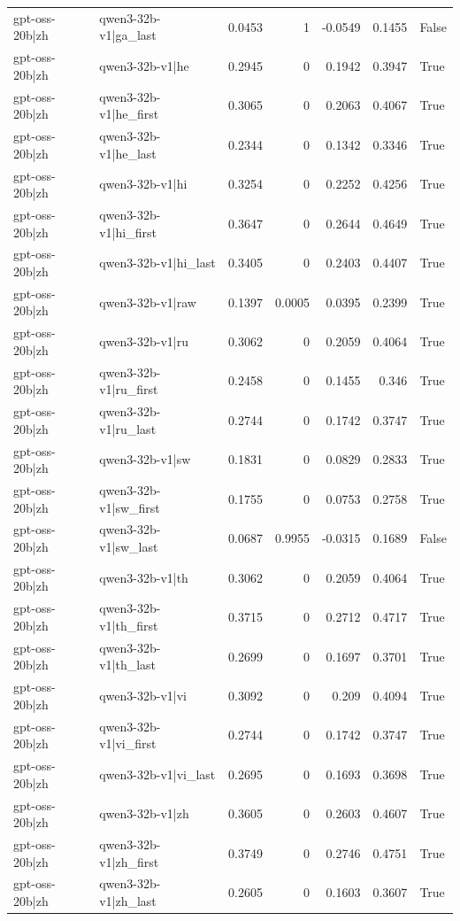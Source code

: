 \begin{table}
\begin{tabular}{l l r r r r l}
gpt-oss-20b|zh & qwen3-32b-v1|ga_last & 0.0453 & 1 & -0.0549 & 0.1455 & False \\
gpt-oss-20b|zh & qwen3-32b-v1|he & 0.2945 & 0 & 0.1942 & 0.3947 & True \\
gpt-oss-20b|zh & qwen3-32b-v1|he_first & 0.3065 & 0 & 0.2063 & 0.4067 & True \\
gpt-oss-20b|zh & qwen3-32b-v1|he_last & 0.2344 & 0 & 0.1342 & 0.3346 & True \\
gpt-oss-20b|zh & qwen3-32b-v1|hi & 0.3254 & 0 & 0.2252 & 0.4256 & True \\
gpt-oss-20b|zh & qwen3-32b-v1|hi_first & 0.3647 & 0 & 0.2644 & 0.4649 & True \\
gpt-oss-20b|zh & qwen3-32b-v1|hi_last & 0.3405 & 0 & 0.2403 & 0.4407 & True \\
gpt-oss-20b|zh & qwen3-32b-v1|raw & 0.1397 & 0.0005 & 0.0395 & 0.2399 & True \\
gpt-oss-20b|zh & qwen3-32b-v1|ru & 0.3062 & 0 & 0.2059 & 0.4064 & True \\
gpt-oss-20b|zh & qwen3-32b-v1|ru_first & 0.2458 & 0 & 0.1455 & 0.346 & True \\
gpt-oss-20b|zh & qwen3-32b-v1|ru_last & 0.2744 & 0 & 0.1742 & 0.3747 & True \\
gpt-oss-20b|zh & qwen3-32b-v1|sw & 0.1831 & 0 & 0.0829 & 0.2833 & True \\
gpt-oss-20b|zh & qwen3-32b-v1|sw_first & 0.1755 & 0 & 0.0753 & 0.2758 & True \\
gpt-oss-20b|zh & qwen3-32b-v1|sw_last & 0.0687 & 0.9955 & -0.0315 & 0.1689 & False \\
gpt-oss-20b|zh & qwen3-32b-v1|th & 0.3062 & 0 & 0.2059 & 0.4064 & True \\
gpt-oss-20b|zh & qwen3-32b-v1|th_first & 0.3715 & 0 & 0.2712 & 0.4717 & True \\
gpt-oss-20b|zh & qwen3-32b-v1|th_last & 0.2699 & 0 & 0.1697 & 0.3701 & True \\
gpt-oss-20b|zh & qwen3-32b-v1|vi & 0.3092 & 0 & 0.209 & 0.4094 & True \\
gpt-oss-20b|zh & qwen3-32b-v1|vi_first & 0.2744 & 0 & 0.1742 & 0.3747 & True \\
gpt-oss-20b|zh & qwen3-32b-v1|vi_last & 0.2695 & 0 & 0.1693 & 0.3698 & True \\
gpt-oss-20b|zh & qwen3-32b-v1|zh & 0.3605 & 0 & 0.2603 & 0.4607 & True \\
gpt-oss-20b|zh & qwen3-32b-v1|zh_first & 0.3749 & 0 & 0.2746 & 0.4751 & True \\
gpt-oss-20b|zh & qwen3-32b-v1|zh_last & 0.2605 & 0 & 0.1603 & 0.3607 & True \\

\end{tabular}
\end{table}
